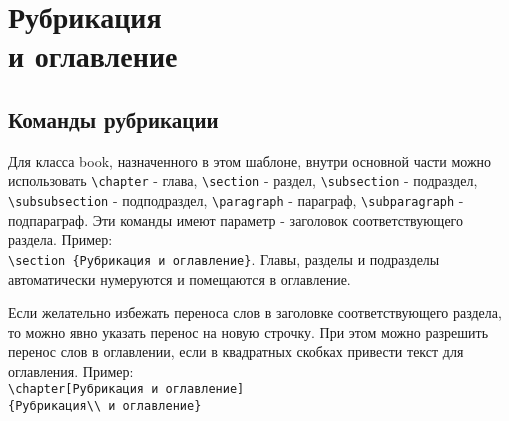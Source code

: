 \chapter[Рубрикация и оглавление]{Рубрикация\\ и оглавление}\label{toc}

\section{Команды рубрикации}
Для класса book, назначенного в этом шаблоне, внутри основной части можно использовать \verb|\chapter| - глава,
\verb|\section| - раздел, \verb|\subsection| - подраздел, \verb|\subsubsection| - подподраздел, \verb|\paragraph| - параграф, \verb|\subparagraph| - подпараграф. Эти команды имеют параметр - заголовок соответствующего раздела. Пример:\\
\verb|\section {Рубрикация и оглавление}|. Главы, разделы и подразделы автоматически нумеруются и помещаются в оглавление.

Если желательно избежать переноса слов в заголовке соответствующего раздела, то можно явно указать перенос на новую строчку. При этом можно разрешить перенос слов в оглавлении, если в квадратных скобках привести текст для оглавления. Пример:\\
\verb|\chapter[Рубрикация и оглавление]|\\\verb|{Рубрикация\\ и оглавление}|

